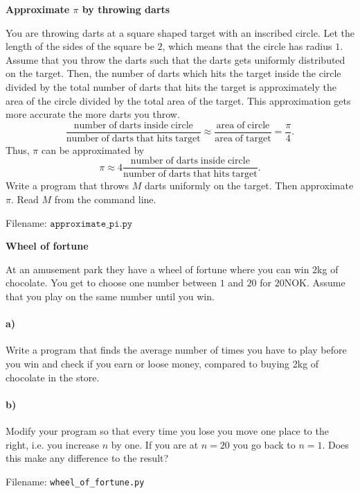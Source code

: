 \begin{Problem}{\textbf{Approximate $\pi$ by throwing darts}}

\noindent You are throwing darts at a square shaped target with an inscribed circle. Let
the length of the sides of the square be $2$, which means that the circle has
radius $1$. Assume that you throw the darts such that the darts gets uniformly
distributed on the target. Then, the number of darts which hits the target inside
the circle divided by the total number of darts that hits the target is
approximately the area of the circle divided by the total area of the target.
This approximation gets more accurate the more darts you throw.
\begin{equation*}
\frac{\mathrm{number\; of\; darts\; inside\; circle}}
{\mathrm{number\; of\; darts\; that\; hits\; target}}
\approx \frac{\mathrm{area\; of\; circle}}{\mathrm{area\; of\; target}}
= \frac{\pi}{4}.
\end{equation*}
Thus, $\pi$ can be approximated by
\begin{equation*}
\pi \approx 4 \frac{\mathrm{number\; of\; darts\; inside\; circle}}
{\mathrm{number\; of\; darts\; that\; hits\; target}}.
\end{equation*}
Write a program that throws $M$ darts uniformly on the target. Then approximate
$\pi$. Read $M$ from the command line.

Filename: $\texttt{approximate\_pi.py}$
\end{Problem}

\begin{Problem}{\textbf{Wheel of fortune}}

\noindent At an amusement park they have a wheel of fortune where you can win $2$kg of
chocolate. You get to choose one number between $1$ and $20$ for $20$NOK. Assume that you
play on the same number until you win.

\paragraph{a)}
Write a program that finds the average number of times you have to play before
you win and check if you earn or loose money, compared to buying 2kg of chocolate in the store.

\paragraph{b)}
Modify your program so that every time you lose you move one place to the right,
i.e. you increase $n$ by one. If you are at $n = 20$ you go back to $n = 1$.
Does this make any difference to the result?

Filename: \texttt{wheel\_of\_fortune.py}
\end{Problem}
